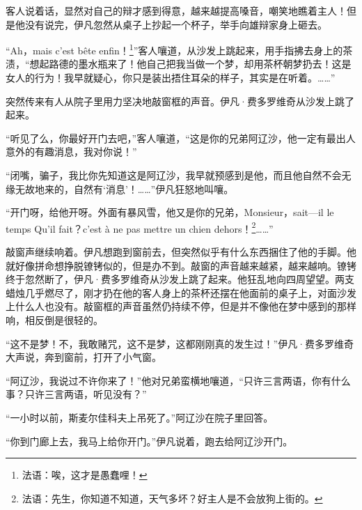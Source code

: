 \par 客人说着话，显然对自己的辩才感到得意，越来越提高嗓音，嘲笑地瞧着主人！但是他没有说完，伊凡忽然从桌子上抄起一个杯子，举手向雄辩家身上砸去。
\par “Ah，mais c’est bête enfin！\footnote{法语：唉，这才是愚蠢哩！}”客人嚷道，从沙发上跳起来，用手指拂去身上的茶渍，“想起路德的墨水瓶来了！他自己把我当做一个梦，却用茶杯朝梦扔去！这是女人的行为！我早就疑心，你只是装出捂住耳朵的样子，其实是在听着。……”
\par 突然传来有人从院子里用力坚决地敲窗框的声音。伊凡·费多罗维奇从沙发上跳了起来。
\par “听见了么，你最好开门去吧，”客人嚷道，“这是你的兄弟阿辽沙，他一定有最出人意外的有趣消息，我对你说！”
\par “闭嘴，骗子，我比你先知道这是阿辽沙，我早就预感到是他，而且他自然不会无缘无故地来的，自然有‘消息’！……”伊凡狂怒地叫嚷。
\par “开门呀，给他开呀。外面有暴风雪，他又是你的兄弟，Monsieur，sait—il le temps Qu’il fait？c’est à ne pas mettre un chien dehors！\footnote{法语：先生，你知道不知道，天气多坏？好主人是不会放狗上街的。}……”
\par 敲窗声继续响着。伊凡想跑到窗前去，但突然似乎有什么东西捆住了他的手脚。他就好像拼命想挣脱镣铐似的，但是办不到。敲窗的声音越来越紧，越来越响。镣铐终于忽然断了，伊凡·费多罗维奇从沙发上跳了起来。他狂乱地向四周望望。两支蜡烛几乎燃尽了，刚才扔在他的客人身上的茶杯还摆在他面前的桌子上，对面沙发上什么人也没有。敲窗框的声音虽然仍持续不停，但是并不像他在梦中感到的那样响，相反倒是很轻的。
\par “这不是梦！不，我敢赌咒，这不是梦，这都刚刚真的发生过！”伊凡·费多罗维奇大声说，奔到窗前，打开了小气窗。
\par “阿辽沙，我说过不许你来了！”他对兄弟蛮横地嚷道，“只许三言两语，你有什么事？只许三言两语，听见没有？”
\par “一小时以前，斯麦尔佳科夫上吊死了。”阿辽沙在院子里回答。
\par “你到门廊上去，我马上给你开门。”伊凡说着，跑去给阿辽沙开门。

